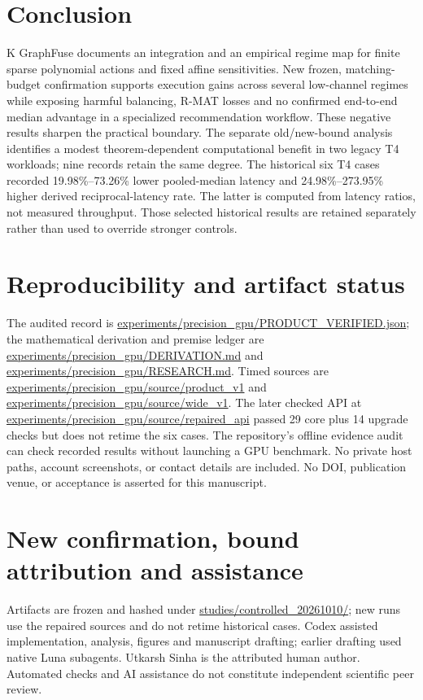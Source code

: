 \documentclass[10pt]{article}
\begin{document}
\section{Conclusion}

K GraphFuse documents an integration and an empirical regime map for finite sparse polynomial actions and fixed affine sensitivities. New frozen, matching-budget confirmation supports execution gains across several low-channel regimes while exposing harmful balancing, R-MAT losses and no confirmed end-to-end median advantage in a specialized recommendation workflow. These negative results sharpen the practical boundary. The separate old/new-bound analysis identifies a modest theorem-dependent computational benefit in two legacy T4 workloads; nine records retain the same degree. The historical six T4 cases recorded 19.98\%--73.26\% lower pooled-median latency and 24.98\%--273.95\% higher derived reciprocal-latency rate. The latter is computed from latency ratios, not measured throughput. Those selected historical results are retained separately rather than used to override stronger controls.


\section*{Reproducibility and artifact status}

The audited record is \url{experiments/precision_gpu/PRODUCT_VERIFIED.json}; the mathematical derivation and premise ledger are \url{experiments/precision_gpu/DERIVATION.md} and \url{experiments/precision_gpu/RESEARCH.md}. Timed sources are \url{experiments/precision_gpu/source/product_v1} and \url{experiments/precision_gpu/source/wide_v1}. The later checked API at \url{experiments/precision_gpu/source/repaired_api} passed 29 core plus 14 upgrade checks but does not retime the six cases. The repository's offline evidence audit can check recorded results without launching a GPU benchmark. No private host paths, account screenshots, or contact details are included. No DOI, publication venue, or acceptance is asserted for this manuscript.

\section*{New confirmation, bound attribution and assistance}
Artifacts are frozen and hashed under \url{studies/controlled_20261010/}; new runs use the repaired sources and do not retime historical cases. Codex assisted implementation, analysis, figures and manuscript drafting; earlier drafting used native Luna subagents. Utkarsh Sinha is the attributed human author. Automated checks and AI assistance do not constitute independent scientific peer review.
\end{document}
